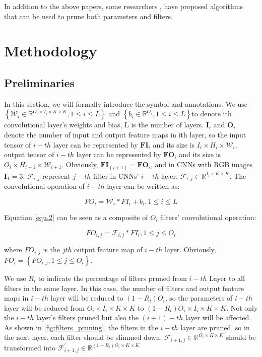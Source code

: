 \documentclass[runningheads]{llncs}
\begin{document}
In addition to the above papers, some researchers \cite{b12}, \cite{b13} have proposed algorithms that can be used to prune both parameters and filters.


\section{Methodology}
\subsection{Preliminaries}\label{AA}
In this section, we will formally introduce the symbol and annotations. We use $\left\{\mathcal{W}_i \in \mathbb{R}^{O_i \times I_i \times K \times K} , 1\leq i \leq L \right\}$ and $\left\{b_i \in \mathbb{R}^{O_i} , 1\leq i \leq L \right\}$to denote ith convolutional layer's weights and bias, L is the number of layers. $\textbf{I}_i$ and $\textbf{O}_i$ denote the number of input and output feature maps in ith layer, so the input tensor of $i-th$ layer can be represented by $\textbf{FI}_i$ and its size is $I_i \times H_i \times \mathcal{W}_i$, output tensor of $i-th$ layer can be represented by $\textbf{FO}_i$ and its size is $O_i \times H_{i+1} \times \mathcal{W}_{i+1}$. Obviously, $\textbf{FI}_(i+1) = \textbf{FO}_i$, and in CNNs with RGB images $\textbf{I}_1 = 3$. $\mathcal{F}_{i,j}$ represent $j-th$ filter in CNNs' $i-th$ layer, $\mathcal{F}_{i,j} \in \mathbb{R}^{I_i \times K \times K}$. The convolutional operation of $i-th$ layer can be written as:

\begin{equation}
FO_{i} = \mathcal{W}_i \ast FI_i + b_i, 1\leq i \leq L
\label{equ.1}
\end{equation}

Equation.\ref{equ.2} can be seen as a composite of  $O_i$ filters' convolutional operation:

\begin{equation}
FO_{i,j} = \mathcal{F}_{i,j} \ast FI_i, 1\leq j \leq O_i
\label{equ.2}
\end{equation}

where $FO_{i,j}$ is the $jth$ output feature map of $i-th$ layer. Obviously, $FO_{i} = \left\{FO_{i,j},  1\leq j \leq O_i \right\}$.

We use $R_i$ to indicate the percentage of filters pruned from $i-th$ Layer to all filters in the same layer. In this case, the number of filters and output feature maps in $i-th$ layer will be reduced to $(1-R_i)O_i$, so the parameters of $i-th$ layer will be reduced from $O_i \times I_i \times K \times K$ to $(1-R_i)O_i \times I_i \times K \times K$. Not only the $i-th$ layer's filters pruned but also the $(i+1)-th$ layer will be affected. As shown in \ref{fig:filters_pruning}, the filters in the $i-th$ layer are pruned, so in the next layer, each filter should be slimmed down. $\mathcal{F}_{i+1,j} \in \mathbb{R}^{O_i \times K \times K}$ should be transformed into $\mathcal{F}^{'}_{i+1,j} \in \mathbb{R}^{(1-R_i)O_i \times K \times K}$
\end{document}
